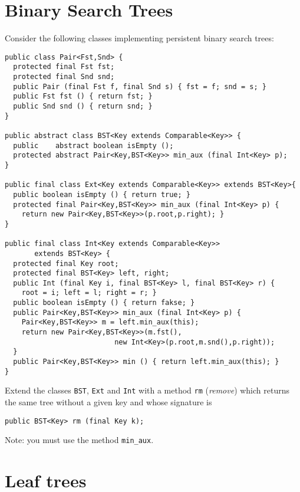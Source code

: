 \documentclass[11pt,a4paper]{article}
\author{Christian Rinderknecht}
\date{24 October 2013}
\begin{document}
\maketitle

\section{Binary Search Trees}

\noindent Consider the following classes implementing persistent
binary search trees:
{\small
\begin{verbatim}
public class Pair<Fst,Snd> {
  protected final Fst fst;
  protected final Snd snd;
  public Pair (final Fst f, final Snd s) { fst = f; snd = s; }
  public Fst fst () { return fst; }
  public Snd snd () { return snd; }
}

public abstract class BST<Key extends Comparable<Key>> {
  public    abstract boolean isEmpty ();
  protected abstract Pair<Key,BST<Key>> min_aux (final Int<Key> p);
}

public final class Ext<Key extends Comparable<Key>> extends BST<Key>{
  public boolean isEmpty () { return true; }
  protected final Pair<Key,BST<Key>> min_aux (final Int<Key> p) {
    return new Pair<Key,BST<Key>>(p.root,p.right); }
}

public final class Int<Key extends Comparable<Key>>
       extends BST<Key> {
  protected final Key root;
  protected final BST<Key> left, right;
  public Int (final Key i, final BST<Key> l, final BST<Key> r) {
    root = i; left = l; right = r; }
  public boolean isEmpty () { return fakse; }
  public Pair<Key,BST<Key>> min_aux (final Int<Key> p) {
    Pair<Key,BST<Key>> m = left.min_aux(this);
    return new Pair<Key,BST<Key>>(m.fst(),
                          new Int<Key>(p.root,m.snd(),p.right));
  }
  public Pair<Key,BST<Key>> min () { return left.min_aux(this); }
}
\end{verbatim}
}
Extend the classes \texttt{BST}, \texttt{Ext} and \texttt{Int} with a method \texttt{rm} (\emph{remove}) which returns the same tree without a given key and whose signature is
\begin{verbatim}
public BST<Key> rm (final Key k);
\end{verbatim}
Note: you must use the method \texttt{min\_aux}.

\section{Leaf trees}
\end{document}
